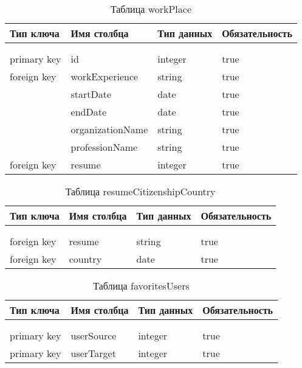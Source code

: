 \begin{xltabular}{\textwidth}{|l|l|p{1.7cm}|X|}
	\caption{Таблица workPlace \label{workPlace:table}}\\ \hline
	\centrow Тип ключа & \centrow Имя столбца & \centrow Тип
	данных & \centrow Обязательность \\ \hline
	 &  &  &  \\ \hline
	\endfirsthead
	 &  &  &  \\ \hline
	\finishhead
	primary key & id & integer & true \\ \hline
	foreign key	& workExperience & string & true \\ \hline
	& startDate & date & true \\ \hline
	& endDate & date & true \\ \hline
	& organizationName & string & true \\ \hline
	& professionName & string & true \\ \hline
	foreign key	& resume & integer & true \\ \hline
\end{xltabular}

\begin{xltabular}{\textwidth}{|l|l|p{1.7cm}|X|}
	\caption{Таблица resumeCitizenshipCountry \label{resumeCitizenshipCountry:table}}\\ \hline
	\centrow Тип ключа & \centrow Имя столбца & \centrow Тип
	данных & \centrow Обязательность \\ \hline
	 &  &  &  \\ \hline
	\endfirsthead
	 &  &  &  \\ \hline
	\finishhead
	foreign key	& resume & string & true \\ \hline
	foreign key& country & date & true \\ \hline
\end{xltabular}

\begin{xltabular}{\textwidth}{|l|l|p{1.7cm}|X|}
	\caption{Таблица favoritesUsers \label{favoritesUsers:table}}\\ \hline
	\centrow Тип ключа & \centrow Имя столбца & \centrow Тип данных & \centrow Обязательность \\ \hline
	 &  &  &  \\ \hline
	\endfirsthead
	 &  &  &  \\ \hline
	\finishhead
	primary key & userSource & integer & true \\ \hline
	primary key & userTarget & integer & true \\ \hline
\end{xltabular}

